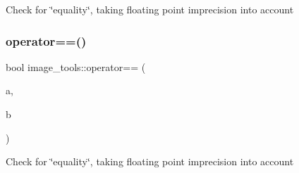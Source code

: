 Check for \char`\"{}equality\char`\"{}, taking floating point imprecision into account \mbox{\label{namespaceimage__tools_af0bb4576a83b836cfec760b95aee081c}} 
\subsubsection{\texorpdfstring{operator==()}{operator==()}\hspace{0.1cm}{\footnotesize\ttfamily [2/2]}}
{\footnotesize\ttfamily bool image\+\_\+tools\+::operator== (\begin{DoxyParamCaption}\item[{const \hyperlink{classimage__tools_1_1PixelBuffer}{Pixel\+Buffer} \&}]{a,  }\item[{const \hyperlink{classimage__tools_1_1PixelBuffer}{Pixel\+Buffer} \&}]{b }\end{DoxyParamCaption})}

Check for \char`\"{}equality\char`\"{}, taking floating point imprecision into account 